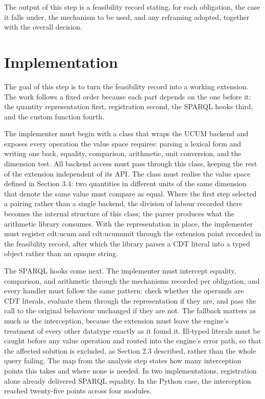 The output of this step is a feasibility record stating, for each obligation, the case it falls under, the mechanism to be used, and any reframing adopted, together with the overall decision.


\section{Implementation}

The goal of this step is to turn the feasibility record into a working extension. The work follows a fixed order because each part depends on the one before it: the quantity representation first, registration second, the SPARQL hooks third, and the custom function fourth.

The implementer must begin with a class that wraps the UCUM backend and exposes every operation the value space requires: parsing a lexical form and writing one back, equality, comparison, arithmetic, unit conversion, and the dimension test. All backend access must pass through this class, keeping the rest of the extension independent of its API. The class must realise the value space defined in Section 3.4: two quantities in different units of the same dimension that denote the same value must compare as equal. Where the first step selected a pairing rather than a single backend, the division of labour recorded there becomes the internal structure of this class; the parser produces what the arithmetic library consumes.
With the representation in place, the implementer must register cdt:ucum and cdt:ucumunit through the extension point recorded in the feasibility record, after which the library parses a CDT literal into a typed object rather than an opaque string. 

The SPARQL hooks come next. The implementer must intercept equality, comparison, and arithmetic through the mechanisms recorded per obligation, and every handler must follow the same pattern: check whether the operands are CDT literals, evaluate them through the representation if they are, and pass the call to the original behaviour unchanged if they are not. The fallback matters as much as the interception, because the extension must leave the engine's treatment of every other datatype exactly as it found it. Ill-typed literals must be caught before any value operation and routed into the engine's error path, so that the affected solution is excluded, as Section 2.3 described, rather than the whole query failing. The map from the analysis step states how many interception points this takes and where none is needed. In two implementations, registration alone already delivered SPARQL equality. In the Python case, the interception reached twenty-five points across four modules.

